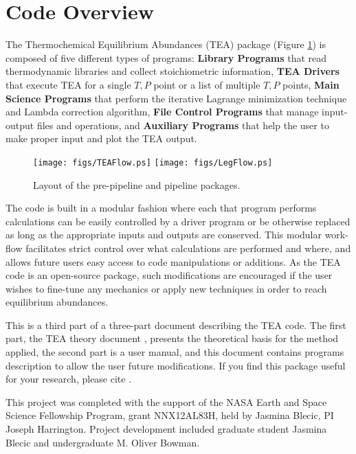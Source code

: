 \newpage
\tableofcontents
\newpage
\section{Code Overview}

The Thermochemical Equilibrium Abundances (TEA) package
(Figure \ref{fig:TEAflow}) is composed of five different types of
programs: {\bf Library Programs} that read thermodynamic libraries and
collect stoichiometric information, {\bf TEA Drivers} that execute TEA
for a single $T, P$ point or a list of multiple $T, P$ points, {\bf
Main Science Programs} that perform the iterative Lagrange
minimization technique and Lambda correction algorithm, {\bf File
Control Programs} that manage input-output files and operations, and
{\bf Auxiliary Programs} that help the user to make proper input and
plot the TEA output.




\begin{figure}[!h]
    \centering
    \texttt{[image: figs/TEAFlow.ps]}
    \texttt{[image: figs/LegFlow.ps]}
\caption{Layout of the pre-pipeline and pipeline packages.}
\label{fig:TEAflow}
\end{figure}




  The code is built in a modular fashion where each that program
  performs calculations can be easily controlled by a driver program
  or be otherwise replaced as long as the appropriate inputs and
  outputs are conserved.  This modular work-flow facilitates strict
  control over what calculations are performed and where, and allows
  future users easy access to code manipulations or additions.  As the
  TEA code is an open-source package, such modifications are
  encouraged if the user wishes to fine-tune any mechanics or apply
  new techniques in order to reach equilibrium abundances.
  
This is a third part of a three-part document describing the TEA
code. The first part, the TEA theory
document \citep{BlecicEtal2015-TEAtheory}, presents the theoretical
basis for the method applied, the second part is a user manual, and
this document contains programs description to allow the user future
modifications. If you find this package useful for your research,
please cite \citet{BlecicEtal2015-TEAtheory}.


  This project was completed with the support of the NASA Earth and
  Space Science Fellowship Program, grant NNX12AL83H, held by Jasmina
  Blecic, PI Joseph Harrington. Project development included graduate
  student Jasmina Blecic and undergraduate M. Oliver Bowman.



